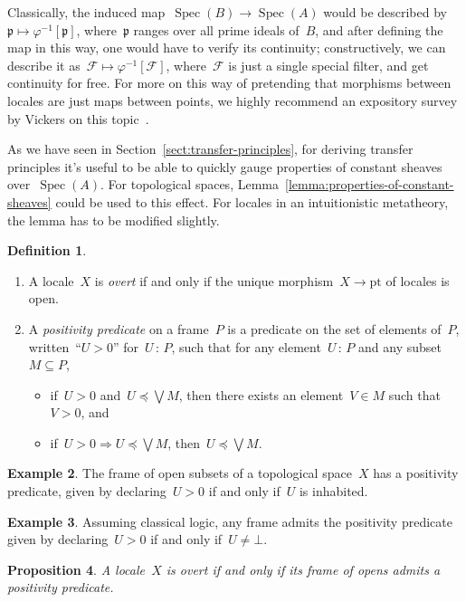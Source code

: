 \documentclass[10pt,reqno,a4paper]{amsbook}
\theoremstyle{definition}
\newtheorem{defn}{Definition}[section]
\newtheorem{ex}[defn]{Example}
\theoremstyle{plain}
\newtheorem{prop}[defn]{Proposition}
\theoremstyle{remark}
\newcommand{\F}{\mathcal{F}}
\newcommand{\ppp}{\mathfrak{p}}
\newcommand{\pt}{\mathrm{pt}}
\DeclareMathOperator{\Spec}{Spec}
\newcommand{\?}{\,{:}\,}
\renewcommand{\_}{\mathpunct{.}\,}
\begin{document}
{Classically, the induced map~$\Spec(B) \to \Spec(A)$ would be described
by~$\ppp \mapsto \varphi^{-1}[\ppp]$, where~$\ppp$ ranges over all prime ideals
of~$B$, and after defining the map in this way, one would have to verify its
continuity; constructively, we can describe it as~$\F \mapsto \varphi^{-1}[\F]$,
where~$\F$ is just a single special filter, and get continuity for free.
For more on this way of pretending that morphisms between locales are just maps
between points, we highly recommend an expository survey by Vickers on this
topic~\cite{vickers:continuity}.

As we have seen in Section~\ref{sect:transfer-principles}, for deriving
transfer principles it's useful to be able to quickly gauge properties of
constant sheaves over~$\Spec(A)$. For topological spaces,
Lemma~\ref{lemma:properties-of-constant-sheaves} could be used to this effect.
For locales in an intuitionistic metatheory, the lemma has to be modified
slightly.

\begin{defn}\begin{enumerate}
\item A locale~$X$ is \emph{overt} if and only if the unique morphism~$X
\to \pt$ of locales is open.
\item A \emph{positivity predicate} on a frame~$P$ is a predicate on the set of
elements of~$P$, written~``$U > 0$'' for~$U \? P$, such that for any element~$U
\? P$ and any subset~$M \subseteq P$,
\begin{itemize}
\item if~$U > 0$ and~$U
\preceq \bigvee M$, then there exists an element~$V \in
M$ such that~$V > 0$, and
\item if~$U > 0 \Longrightarrow U \preceq \bigvee M$, then~$U \preceq \bigvee M$.
\end{itemize}
\end{enumerate}
\end{defn}

\begin{ex}The frame of open subsets of a topological space~$X$ has a positivity
predicate, given by declaring~$U > 0$ if and only if~$U$ is inhabited.\end{ex}

\begin{ex}Assuming classical logic, any frame admits the positivity predicate
given by declaring~$U > 0$ if and only if~$U \neq \bot$.\end{ex}

\begin{prop}A locale~$X$ is overt if and only if its frame of opens admits a
\emph{positivity predicate}.\end{prop}

}
\end{document}
